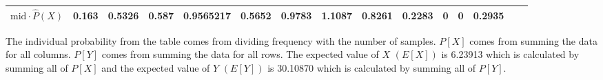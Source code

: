 \begin{table}[hb!]
\begin{adjustbox}{width = \textwidth, center}
\begin{tabular}{|c|r|r|r|r|r|r|r|r|r|r|r|r|r|r|}
        \cellcolor[HTML]{D9EAD3}$\mathrm{mid}\cdot\widehat{P}(X)$   & \cellcolor[HTML]{D9EAD3}0.163                  & \cellcolor[HTML]{D9EAD3}0.5326                 & \cellcolor[HTML]{D9EAD3}0.587                  & \cellcolor[HTML]{D9EAD3}0.9565217              & \cellcolor[HTML]{D9EAD3}0.5652                 & \cellcolor[HTML]{D9EAD3}0.9783                 & \cellcolor[HTML]{D9EAD3}1.1087                 & \cellcolor[HTML]{D9EAD3}0.8261                  & \cellcolor[HTML]{D9EAD3}0.2283                  & \cellcolor[HTML]{D9EAD3}0                       & \cellcolor[HTML]{D9EAD3}0                       & \cellcolor[HTML]{D9EAD3}0.2935                  & \multicolumn{1}{l|}{}                                                           & \multicolumn{1}{l|}{}                                                                 \\ \hline
        \end{tabular}
    \end{adjustbox}
\end{table}
The individual probability from the table comes from dividing frequency with the number of samples. $P[X]$ comes from summing the data for all columns. $P[Y]$ comes from summing the data for all rows. The expected value of $X$ $(E[X])$ is 6.23913 which is calculated by summing all of $P[X]$ and the expected value of $Y$ $(E[Y])$ is 30.10870 which is calculated by summing all of $P[Y]$.
